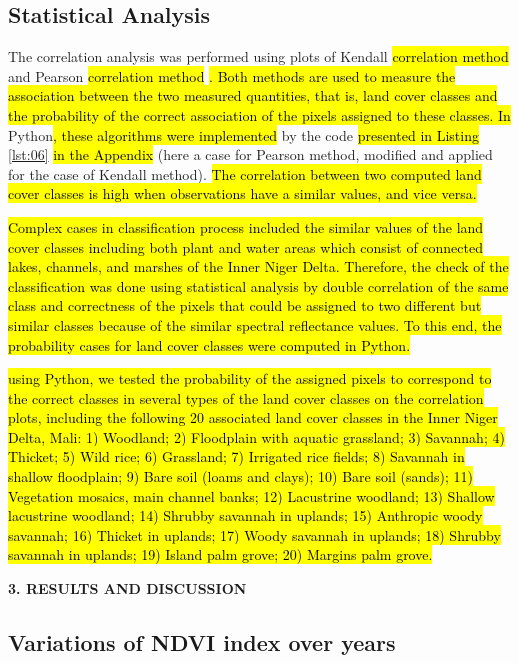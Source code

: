 \documentclass[12pt,a4paper,oneside]{article}
\def \newsection{\vspace{12pt}\textbf}
\def \newpar{\vspace{6pt}}
\begin{document}
\subsection*{Statistical Analysis}

\newpar The correlation analysis was performed using plots of Kendall \hl{correlation method} \citep{Kendall1938} and Pearson \hl{correlation method} \citep{Pearson1895}\hl{. Both methods are used to measure the association between the two measured quantities, that is, land cover classes and the probability of the correct association of the pixels assigned to these classes. In} Python\hl{, these algorithms were implemented }by the code \hl{presented in Listing} \ref{lst:06} \hl{in the Appendix} (here a case for Pearson method, modified and applied for the case of Kendall method). \hl{The correlation between two computed land cover classes is high when observations have a similar values, and vice versa.}

\newpar \hl{Complex cases in classification process included the similar values of the land cover classes including both plant and water areas which consist of connected lakes, channels, and marshes of the Inner Niger Delta. Therefore, the check of the classification was done using statistical analysis by double correlation of the same class and correctness of the pixels that could be assigned to two different but similar classes because of the similar spectral reflectance values. To this end, the probability cases for land cover classes were computed in Python. }

\newpar \hl{using Python, we tested the probability of the assigned pixels to correspond to the correct classes in several types of the land cover classes on the correlation plots, including the following 20 associated land cover classes in the Inner Niger Delta, Mali: 1) Woodland; 2) Floodplain with aquatic grassland; 3) Savannah; 4) Thicket; 5) Wild rice; 6) Grassland; 7) Irrigated rice fields; 8) Savannah in shallow floodplain; 9) Bare soil (loams and clays); 10) Bare soil (sands); 11) Vegetation mosaics, main channel banks; 12) Lacustrine woodland; 13) Shallow lacustrine woodland; 14) Shrubby savannah in uplands; 15) Anthropic woody savannah; 16) Thicket in uplands; 17) Woody savannah in uplands; 18) Shrubby savannah in uplands; 19) Island palm grove; 20) Margins palm grove. }

\newsection {3. RESULTS AND DISCUSSION}

\subsection*{Variations of NDVI index over years}
\end{document}
